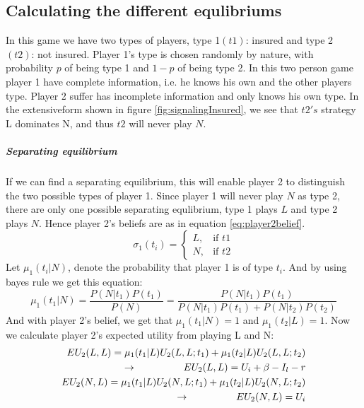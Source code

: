 \subsection{Calculating the different equlibriums}
In this game we have two types of players, type 1$(t1)$: insured and type 2 $(t2)$: not insured. 
Player 1's type is chosen randomly by nature, with probability $p$ of being type 1 and $1-p$ of being type 2.
In this two person game player 1 have complete information, i.e. he knows his own and the other players type. Player 2 suffer has incomplete information and only knows his own type. 
In the extensiveform shown in figure \ref{fig:signalingInsured}, we see that $t2's$ strategy L dominates N, and thus $t2$ will never play $N$.
\subparagraph{Separating equilibrium}
If we can find a separating equilibrium, this will enable player 2 to distinguish the two possible types of player 1.
Since player 1 will never play $N$ as type 2, there are only one possible separating equlibrium, type 1 plays $L$ and type 2 plays $N$. Hence player 2's beliefs are as in equation \ref{eq:player2belief}.
\begin{equation}
    \sigma_{1}(t_{i})= 
\begin{cases}
   L,& \text{if } t1\\
   N,& \text{if } t2  
\end{cases}
\label{eq:player2belief}
\end{equation}
Let $\mu_{1}(t_{i} | N )$, denote the probability that player 1 is of type $t_{i}$. And by using bayes rule we get this equation:
\begin{equation}
\mu_{1}(t_{1} | N )=\frac{P(N|t_{1})P(t_{1})}{P(N)}=\frac{P(N|t_{1})P(t_{1})}{P(N|t_{1})P(t_{1})+P(N|t_{2})P(t_{2})}
\end{equation}
And with player 2's belief, we get that $\mu_{1}(t_{1} | N )=1$ and $\mu_{1}(t_{2} | L )= 1 $. Now we calculate player 2's expected utility from playing L and N:
\begin{eqnarray}
EU_{2}(L,L)=\mu_{1}(t_{1} | L )U_{2}(L,L;t_{1})+\mu_{1}(t_{2} | L )U_{2}(L,L;t_{2}) \nonumber\\
\llap{$\rightarrow$\hspace{50pt}}EU_{2}(L,L)=U_{i}+\beta-I_{l}-r \\
EU_{2}(N,L)=\mu_{1}(t_{1} | L )U_{2}(N,L;t_{1})+\mu_{1}(t_{2} | L )U_{2}(N,L;t_{2})\nonumber\\
\llap{$\rightarrow$\hspace{50pt}}EU_{2}(N,L)=U_{i}
\end{eqnarray}
